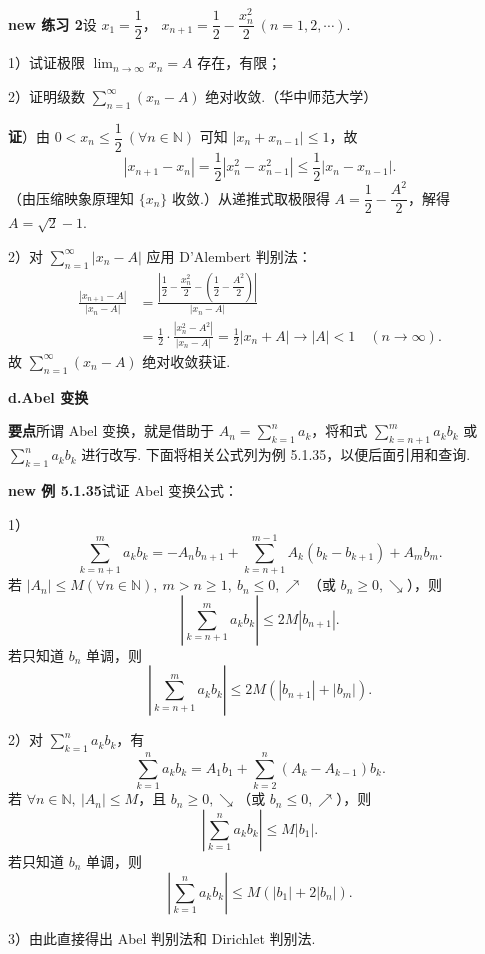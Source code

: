 \documentclass[UTF8,12pt,a4paper,fontset=fandol]{ctexart}
\begin{document}
\noindent\textbf{new 练习 2}\quad 设 $x_1=\dfrac12$，
$x_{n+1}=\dfrac12-\dfrac{x_n^2}2\ (n=1,2,\cdots)$.

1）试证极限 $\displaystyle\lim_{n\to\infty}x_n=A$ 存在，有限；

2）证明级数 $\displaystyle\sum_{n=1}^{\infty}(x_n-A)$ 绝对收敛.（华中师范大学）

\noindent\textbf{证}）由 $0<x_n\le\dfrac12\ (\forall n\in\mathbb N)$ 可知 $|x_n+x_{n-1}|\le1$，故
\[
  |x_{n+1}-x_n|
  =\frac12|x_n^2-x_{n-1}^2|
  \le\frac12|x_n-x_{n-1}|.
\]
（由压缩映象原理知 $\{x_n\}$ 收敛.）从递推式取极限得
$A=\dfrac12-\dfrac{A^2}2$，解得 $A=\sqrt2-1$.

2）对 $\displaystyle\sum_{n=1}^{\infty}|x_n-A|$ 应用 D'Alembert 判别法：
\[
\begin{aligned}
  \frac{|x_{n+1}-A|}{|x_n-A|}
  &=\frac{\left|\dfrac12-\dfrac{x_n^2}2-\left(\dfrac12-\dfrac{A^2}2\right)\right|}
          {|x_n-A|}\\
  &=\frac12\cdot\frac{|x_n^2-A^2|}{|x_n-A|}
  =\frac12|x_n+A|\to |A|<1\quad(n\to\infty).
\end{aligned}
\]
故 $\displaystyle\sum_{n=1}^{\infty}(x_n-A)$ 绝对收敛获证.

\noindent\textbf{d.\quad Abel 变换}

\noindent\textbf{要点}\quad 所谓 Abel 变换，就是借助于
$A_n=\displaystyle\sum_{k=1}^n a_k$，将和式
$\displaystyle\sum_{k=n+1}^m a_kb_k$ 或
$\displaystyle\sum_{k=1}^n a_kb_k$ 进行改写. 下面将相关公式列为例 5.1.35，以便后面引用和查询.

\noindent\textbf{new 例 5.1.35}\quad 试证 Abel 变换公式：

1）
\[
  \sum_{k=n+1}^m a_kb_k
  =-A_nb_{n+1}+\sum_{k=n+1}^{m-1}A_k(b_k-b_{k+1})+A_mb_m.
\tag{A}
\]
若 $|A_n|\le M(\forall n\in\mathbb N),\ m>n\ge1,\ b_n\le0,\nearrow$
（或 $b_n\ge0,\searrow$），则
\[
  \left|\sum_{k=n+1}^m a_kb_k\right|\le2M|b_{n+1}|.
\tag{B}
\]
若只知道 $b_n$ 单调，则
\[
  \left|\sum_{k=n+1}^m a_kb_k\right|
  \le2M(|b_{n+1}|+|b_m|).
\tag{C}
\]

2）对 $\displaystyle\sum_{k=1}^n a_kb_k$，有
\[
  \sum_{k=1}^n a_kb_k=A_1b_1+\sum_{k=2}^n(A_k-A_{k-1})b_k.
\tag{$A_1$}
\]
若 $\forall n\in\mathbb N,\ |A_n|\le M$，且 $b_n\ge0,\searrow$（或 $b_n\le0,\nearrow$），则
\[
  \left|\sum_{k=1}^n a_kb_k\right|\le M|b_1|.
\tag{$B_1$}
\]
若只知道 $b_n$ 单调，则
\[
  \left|\sum_{k=1}^n a_kb_k\right|\le M(|b_1|+2|b_n|).
\tag{$C_1$}
\]

3）由此直接得出 Abel 判别法和 Dirichlet 判别法.
\end{document}
